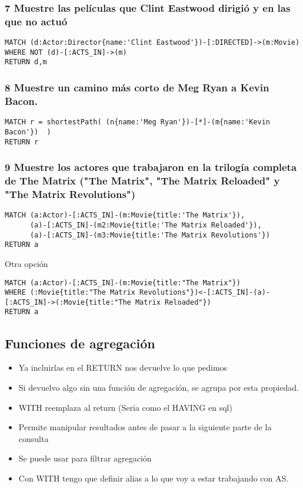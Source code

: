 \subsubsection*{7 Muestre las películas que Clint Eastwood dirigió y en las que no actuó}

\begin{verbatim}
MATCH (d:Actor:Director{name:'Clint Eastwood'})-[:DIRECTED]->(m:Movie)
WHERE NOT (d)-[:ACTS_IN]->(m) 
RETURN d,m
\end{verbatim}



\subsubsection*{8 Muestre un camino más corto de Meg Ryan a Kevin Bacon.}

\begin{verbatim}
MATCH r = shortestPath( (n{name:'Meg Ryan'})-[*]-(m{name:'Kevin Bacon'})  )
RETURN r
\end{verbatim}

\subsubsection*{9 Muestre los actores que trabajaron en la trilogía completa de The Matrix ("The Matrix", "The Matrix Reloaded" y "The Matrix Revolutions")}

\begin{verbatim}
MATCH (a:Actor)-[:ACTS_IN]-(m:Movie{title:'The Matrix'}),
      (a)-[:ACTS_IN]-(m2:Movie{title:'The Matrix Reloaded'}),
      (a)-[:ACTS_IN]-(m3:Movie{title:'The Matrix Revolutions'})
RETURN a
\end{verbatim}

Otra opción

\begin{verbatim}
MATCH (a:Actor)-[:ACTS_IN]-(m:Movie{title:"The Matrix"})
WHERE (:Movie{title:"The Matrix Revolutions"})<-[:ACTS_IN]-(a)-[:ACTS_IN]->(:Movie{title:"The Matrix Reloaded"})
RETURN a
\end{verbatim}

\subsection*{Funciones de agregación}
\begin{itemize}
\item Ya incluirlas en el RETURN nos devuelve lo que pedimos
\item Si devuelvo algo sin una función de agregación, se agrupa por esta propiedad.
\item WITH reemplaza al return (Seria como el HAVING en sql)
\item Permite manipular resultados antes de pasar a la siguiente parte de la consulta
\item Se puede usar para filtrar agregación
\item Con WITH tengo que definir alias a lo que voy a estar trabajando con AS.
\end{itemize}



